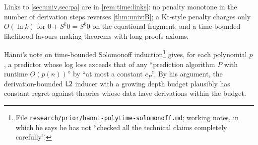 \noindent Links to \cref{sec:univ,sec:pa} are in \cref{rem:time:links}: no penalty monotone in the number of derivation steps reverses \cref{thm:univ:B}; a Kt-style penalty charges only $O(\ln k)$ for $0+S^k0=S^k0$ on the equational fragment; and a time-bounded likelihood favours making theorems with long proofs axioms.

\begin{conjecture}\label{conj:time:polytime}
H\"anni's note on time-bounded Solomonoff induction\footnote{File \texttt{research/prior/hanni-polytime-solomonoff.md}; working notes, in which he says he has not ``checked all the technical claims completely carefully''.} gives, for each polynomial $p$, a predictor whose log loss exceeds that of any ``prediction algorithm $P$ with runtime $O(p(n))$'' by ``at most a constant $c_P$''. By his argument, the derivation-bounded $\mathord{\mathsf{L2}}$ inducer with a growing depth budget plausibly has constant regret against theories whose data have derivations within the budget.
\end{conjecture}
